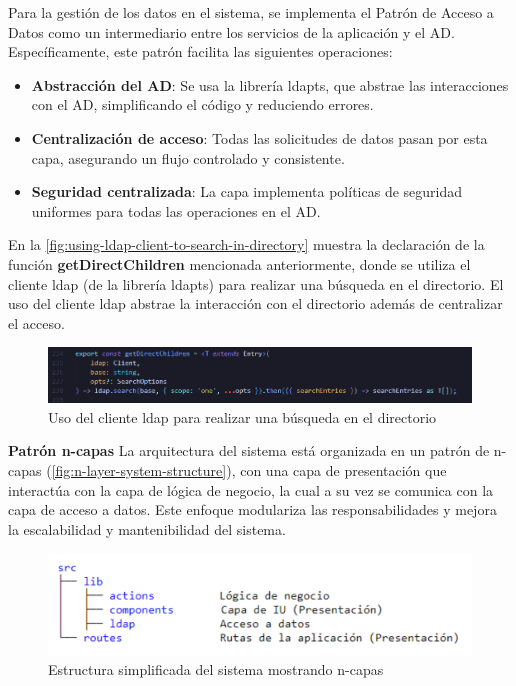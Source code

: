 Para la gestión de los datos en el sistema, se implementa el Patrón de Acceso a Datos como un intermediario entre los servicios de la aplicación y el AD. Específicamente, este patrón facilita las siguientes operaciones:
\begin{itemize}
    \item \textbf{Abstracción del AD}: Se usa la librería ldapts, que abstrae las interacciones con el AD, simplificando el código y reduciendo errores.
    \item \textbf{Centralización de acceso}: Todas las solicitudes de datos pasan por esta capa, asegurando un flujo controlado y consistente.
    \item \textbf{Seguridad centralizada}: La capa implementa políticas de seguridad uniformes para todas las operaciones en el AD.
\end{itemize}

En la \autoref{fig:using-ldap-client-to-search-in-directory} muestra la declaración de la función \textbf{getDirectChildren} mencionada anteriormente, donde se utiliza el cliente ldap (de la librería ldapts) para realizar una búsqueda en el directorio. El uso del cliente ldap abstrae la interacción con el directorio además de centralizar el acceso.

\begin{figure}[h]
    \centering
    \includegraphics[width=\linewidth]{images/code/getDirectChildren.png}
    \caption{Uso del cliente ldap para realizar una búsqueda en el directorio}
    \label{fig:using-ldap-client-to-search-in-directory}
\end{figure}

\textbf{Patrón n-capas}
La arquitectura del sistema está organizada en un patrón de n-capas (\autoref{fig:n-layer-system-structure}), con una capa de presentación que interactúa con la capa de lógica de negocio, la cual a su vez se comunica con la capa de acceso a datos. Este enfoque modulariza las responsabilidades y mejora la escalabilidad y mantenibilidad del sistema.

\begin{figure}[h]
    \centering
    \includegraphics[width=\linewidth]{images/app-folder-structure.png}
    \caption{Estructura simplificada del sistema mostrando n-capas}
    \label{fig:n-layer-system-structure}
\end{figure}